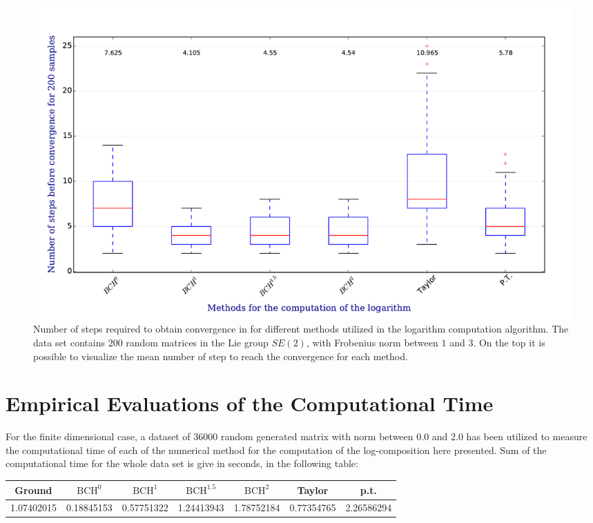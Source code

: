 \begin{figure}[!ht]
	\hspace{-0.5cm}
	\includegraphics[scale=0.5]{figures/log_computation_boxplot.pdf}
	\caption{Number of steps required to obtain convergence in for different methods utilized in the logarithm computation algorithm. The data set contains $200$ random matrices in the Lie group $SE(2)$, with Frobenius norm between $1$ and $3$. On the top it is possible to visualize the mean number of step to reach the convergence for each method.}
	\label{fig:log_computation_boxplot}
\end{figure}


\section{Empirical Evaluations of the Computational Time}

For the finite dimensional case, a dataset of $36000$ random generated matrix with norm between $0.0$ and $2.0$ has been utilized to measure the computational time of each of the numerical method for the computation of the log-composition here presented. Sum of the computational time for the whole data set is give in seconds, in the following table:\\

\hspace{-1cm}
\begin{tabular}{ c | c | c | c | c | c | c }
Ground & $\text{BCH}^0$ & $\text{BCH}^1$ & $\text{BCH}^{1.5}$ & $\text{BCH}^2$ & Taylor & p.t. \\
\hline
1.07402015 & 0.18845153 & 0.57751322 & 1.24413943 & 1.78752184 & 0.77354765 &
2.26586294 
\end{tabular}
\vspace{0.5cm}

